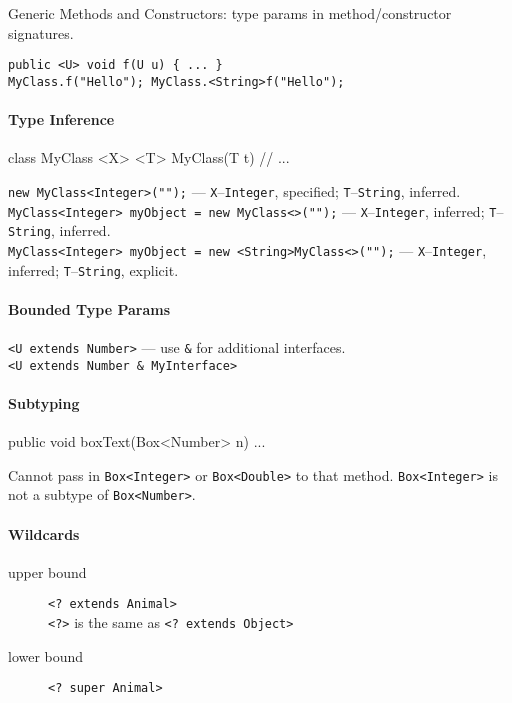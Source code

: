 Generic Methods and Constructors:
type params in method/constructor signatures.
\begin{verbatim}
public <U> void f(U u) { ... }
MyClass.f("Hello"); MyClass.<String>f("Hello");
\end{verbatim}

\paragraph{Type Inference}
\begin{verbatimtab}
class MyClass <X> {
	<T> MyClass(T t) {
		// ...
	}
}
\end{verbatimtab}
\verb=new MyClass<Integer>("");= ---
\verb=X=--\verb=Integer=, specified; \verb=T=--\verb=String=, inferred.\\
\verb|MyClass<Integer> myObject = new MyClass<>("");| ---
\verb=X=--\verb=Integer=, inferred; \verb=T=--\verb=String=, inferred.\\
\verb|MyClass<Integer> myObject = new <String>MyClass<>("");| ---
\verb=X=--\verb=Integer=, inferred; \verb=T=--\verb=String=, explicit.

\paragraph{Bounded Type Params}
\verb=<U extends Number>= --- use \verb=&= for additional interfaces.\\
\verb=<U extends Number & MyInterface>=

\paragraph{Subtyping}
\begin{verbatimtab}
public void boxText(Box<Number> n) {
	...
}
\end{verbatimtab}
Cannot pass in \verb=Box<Integer>= or \verb=Box<Double>= to that method.
\verb=Box<Integer>= is not a subtype of \verb=Box<Number>=.

\paragraph{Wildcards}
\begin{description}
\item[upper bound]
\verb=<? extends Animal>=\\
\verb=<?>= is the same as \verb=<? extends Object>=
\item[lower bound]
\verb=<? super Animal>=
\end{description}

